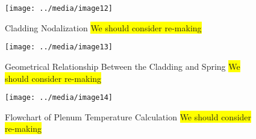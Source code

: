 \begin{figure}
    \texttt{[image: ../media/image12]}
    \caption{Cladding Nodalization \colorbox{yellow}{We should consider re-making}}
    \label{fig:cladding_nodalization}
\end{figure}

\begin{figure}
    \texttt{[image: ../media/image13]}
    \caption{Geometrical Relationship Between the Cladding and Spring \colorbox{yellow}{We should consider re-making}}
    \label{fig:plenum_temp_geometry_clad_spring}
\end{figure}

\begin{figure}
    \texttt{[image: ../media/image14]}
    \caption{Flowchart of Plenum Temperature Calculation \colorbox{yellow}{We should consider re-making}}
    \label{fig:plenum_temp_flowchart}
\end{figure}

